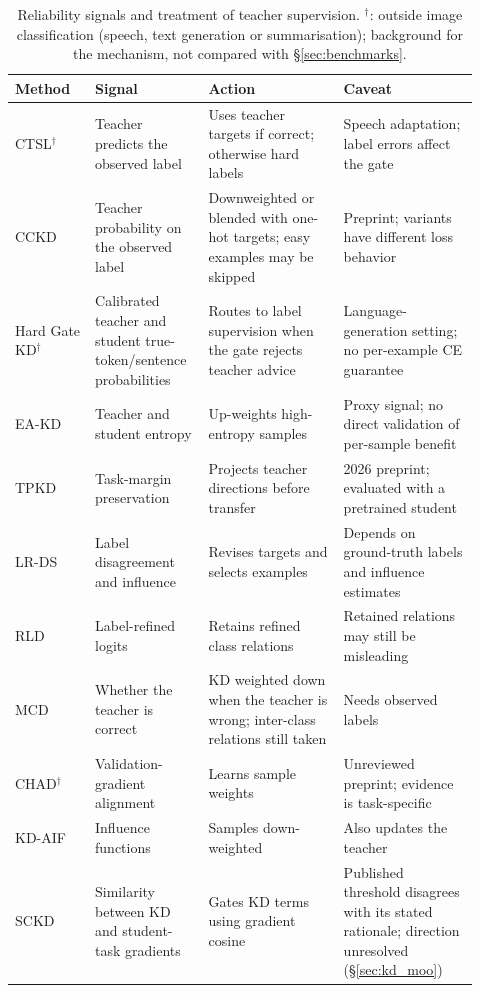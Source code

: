 \begin{table}[tbp]
\centering
\footnotesize
\setlength{\tabcolsep}{3pt}
\caption{Reliability signals and treatment of teacher supervision. $^\dagger$: outside image classification (speech, text generation or summarisation); background for the mechanism, not compared with \S\ref{sec:benchmarks}.}
\label{tab:reliability}
\begin{tabular}{p{0.16\linewidth}p{0.22\linewidth}p{0.27\linewidth}p{0.27\linewidth}}
\toprule
Method & Signal & Action & Caveat \\
\midrule
CTSL$^\dagger$ \citep{meng2019conditionalts} & Teacher predicts the observed label & Uses teacher targets if correct; otherwise hard labels & Speech adaptation; label errors affect the gate \\
CCKD \citep{mishra2021cckd} & Teacher probability on the observed label & Downweighted or blended with one-hot targets; easy examples may be skipped & Preprint; variants have different loss behavior \\
Hard Gate KD$^\dagger$ \citep{lee2022hardgatekd} & Calibrated teacher and student true-token/sentence probabilities & Routes to label supervision when the gate rejects teacher advice & Language-generation setting; no per-example CE guarantee \\
EA-KD \citep{su2025eakd} & Teacher and student entropy & Up-weights high-entropy samples & Proxy signal; no direct validation of per-sample benefit \\
TPKD \citep{yuan2026tpkd} & Task-margin preservation & Projects teacher directions before transfer & 2026 preprint; evaluated with a pretrained student \\
LR-DS \citep{lan2025labelrevision} & Label disagreement and influence & Revises targets and selects examples & Depends on ground-truth labels and influence estimates \\
RLD \citep{sun2025rld} & Label-refined logits & Retains refined class relations & Retained relations may still be misleading \\
MCD \citep{mishra2026mcd} & Whether the teacher is correct & KD weighted down when the teacher is wrong; inter-class relations still taken & Needs observed labels \\
CHAD$^\dagger$ \citep{sumit2026chad} & Validation-gradient alignment & Learns sample weights & Unreviewed preprint; evidence is task-specific \\
KD-AIF \citep{wu2025kdaif} & Influence functions & Samples down-weighted & Also updates the teacher \\
SCKD \citep{zhu2021sckd} & Similarity between KD and student-task gradients & Gates KD terms using gradient cosine & Published threshold disagrees with its stated rationale; direction unresolved (\S\ref{sec:kd_moo}) \\
\bottomrule
\end{tabular}
\end{table}

